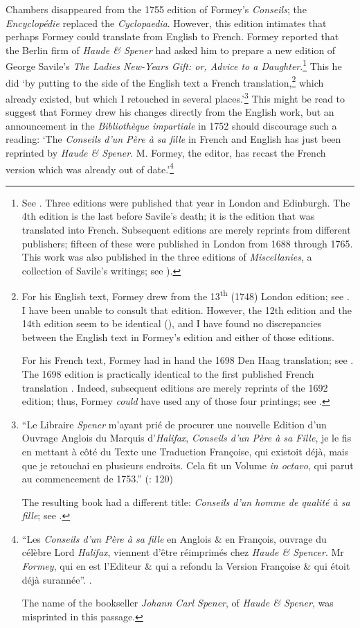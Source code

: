 \documentclass[output=paper]{langscibook}
\begin{document}
Chambers disappeared from the 1755 edition of Formey’s \emph{Conseils}; the \emph{Encyclopédie} replaced the \emph{Cyclopaedia}. However, this edition intimates that perhaps Formey could translate from English to French. Formey reported that the Berlin firm of \emph{Haude \& Spener} had asked him to prepare a new edition of George Savile’s \emph{The Ladies New-Years Gift: or, Advice to a Daughter}.\footnote{See \citep{Savile1688}. Three editions were published that year in London and Edinburgh. The 4th edition is the last before Savile’s death; it is the edition that was translated into French. Subsequent editions are merely reprints from different publishers; fifteen of these were published in London from 1688 through 1765. This work was also published in the three editions of \emph{Miscellanies}, a collection of Savile’s writings; see \citet{Savile1700, Savile1704, Savile1717}).}  This he did ‘by putting to the side of the English text a French translation,\footnote{For his English text, Formey drew from the 13\textsuperscript{th} (1748) London edition; see \citet["Avertissement"]{Savile1752, }. I have been unable to consult that edition. However, the 12th edition and the 14th edition seem to be identical (\citealt{Savile1741,Savile1756}), and I have found no discrepancies between the English text in Formey’s edition and either of those editions.

For his French text, Formey had in hand the 1698 Den Haag translation; see  \citet[“Avertissement”]{Savile1698,Savile1752}. The 1698 edition is practically identical to the first published French translation \citep{Savile1692}. Indeed, subsequent editions are merely reprints of the 1692 edition; thus, Formey \emph{could} have used any of those four printings; see \citet{Savile1692,Savile1699,Savile1748}.
} which already existed, but which I retouched in several places.’\footnote{“Le Libraire \emph{Spener} m’ayant prié de procurer une nouvelle Edition d’un Ouvrage Anglois du Marquis d’\emph{Halifax}, \emph{Conseils d’un Père à sa Fille}, je le fis en mettant à côté du Texte une Traduction Françoise, qui existoit déjà, mais que je retouchai en plusieurs endroits. Cela fit un Volume \emph{in octavo}, qui parut au commencement de 1753.” (\citealt{Formey1755}:  120)

The resulting book had a different title: \emph{Conseils d’un homme de qualité à sa fille}; see \citet{Savile1752}. 
}  This might be read to suggest that Formey drew his changes directly from the English work, but an announcement in the \emph{Bibliothèque impartiale} in 1752 should discourage such a reading: ‘The \emph{Conseils d’un Père à sa fille} in French and English has just been reprinted by \emph{Haude \& Spener}. M. Formey, the editor, has recast the French version which was already out of date.’\footnote{“Les \emph{Conseils d’un Père à sa fille} en Anglois \& en François, ouvrage du célèbre Lord \emph{Halifax}, viennent d’être réimprimés chez \emph{Haude \& Spencer}. Mr \emph{Formey}, qui en est l’Editeur \& qui a refondu la Version Françoise \& qui étoit déjà surannée”. \citep[1, 158]{Luzac1752}.

The name of the bookseller \emph{Johann Carl Spener}, of \emph{Haude \& Spener}, was misprinted in this passage. 
} 
\end{document}
